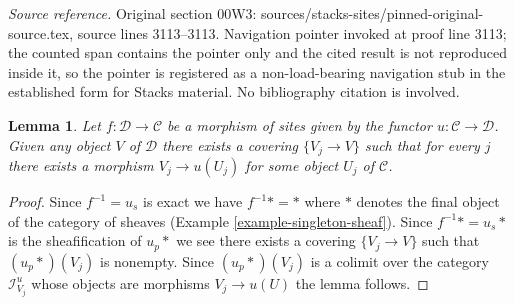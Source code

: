 \documentclass[10pt,a4paper]{amsart}
\theoremstyle{plain}
\newtheorem{lemma}[subsection]{Lemma}
\theoremstyle{definition}
\theoremstyle{remark}
\numberwithin{equation}{subsection}
\begin{document}
\noindent\textit{Source reference.} Original section 00W3: sources/stacks-sites/pinned-original-source.tex, source lines 3113--3113. Navigation pointer invoked at proof line 3113; the counted span contains the pointer only and the cited result is not reproduced inside it, so the pointer is registered as a non-load-bearing navigation stub in the established form for Stacks material. No bibliography citation is involved.\par\medskip
\begin{lemma}
\label{lemma-morphism-of-sites-covering}
Let $f : \mathcal{D} \to \mathcal{C}$ be a morphism of sites given by the
functor $u : \mathcal{C} \to \mathcal{D}$. Given any object $V$ of
$\mathcal{D}$ there exists a covering $\{V_j \to V\}$ such that for every
$j$ there exists a morphism $V_j \to u(U_j)$ for some object $U_j$
of $\mathcal{C}$.
\end{lemma}

\begin{proof}
Since $f^{-1} = u_s$ is exact we have $f^{-1}* = *$ where $*$ denotes the
final object of the category of sheaves
(Example \ref{example-singleton-sheaf}).
Since $f^{-1}* = u_s*$ is the sheafification of $u_p*$ we see
there exists a covering $\{V_j \to V\}$ such that $(u_p*)(V_j)$
is nonempty. Since $(u_p*)(V_j)$ is a colimit over the category
$\mathcal{I}^u_{V_j}$ whose objects are morphisms $V_j \to u(U)$
the lemma follows.
\end{proof}
\end{document}
